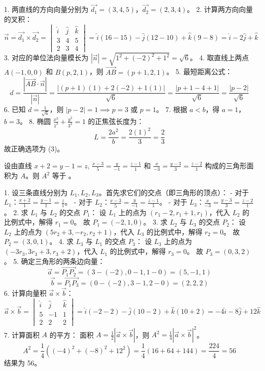 \begin{questions}
\begin{solution}
1. 两直线的方向向量分别为 $\vec{d_1} = (3, 4, 5)$，$\vec{d_2} = (2, 3, 4)$。
2. 计算两方向向量的叉积：
\[
\vec{n} = \vec{d_1} \times \vec{d_2} = \begin{vmatrix} \hat{i} & \hat{j} & \hat{k} \\ 3 & 4 & 5 \\ 2 & 3 & 4 \end{vmatrix} = \hat{i}(16-15) - \hat{j}(12-10) + \hat{k}(9-8) = \hat{i} - 2\hat{j} + \hat{k}
\]
3. 对应的单位法向量模长为 $|\vec{n}| = \sqrt{1^2 + (-2)^2 + 1^2} = \sqrt{6}$。
4. 取直线上两点 $A(-1, 0, 0)$ 和 $B(p, 2, 1)$，则 $\vec{AB} = (p+1, 2, 1)$。
5. 最短距离公式：
\[
d = \frac{|\vec{AB} \cdot \vec{n}|}{|\vec{n}|} = \frac{|(p+1)(1) + 2(-2) + 1(1)|}{\sqrt{6}} = \frac{|p+1-4+1|}{\sqrt{6}} = \frac{|p-2|}{\sqrt{6}}
\]
6. 已知 $d = \frac{1}{\sqrt{6}}$，则 $|p-2| = 1 \implies p = 3$ 或 $p = 1$。
7. 根据 $a < b$，得 $a = 1$，$b = 3$。
8. 椭圆 $\frac{x^2}{1^2} + \frac{y^2}{3^2} = 1$ 的正焦弦长度为：
\[
L = \frac{2a^2}{b} = \frac{2(1)^2}{3} = \frac{2}{3}
\]
故正确选项为 (3)。
\end{solution}

    \question
设由直线 $x + 2 = y - 1 = z$, $\frac{x-3}{5} = \frac{y}{-1} = \frac{z-1}{1}$ 和 $\frac{x}{-3} = \frac{y-3}{3} = \frac{z-2}{1}$ 构成的三角形面积为 $A$。则 $A^2$ 等于 \underline{\quad}。

\begin{solution}
1. 设三条直线分别为 $L_1, L_2, L_3$。首先求它们的交点（即三角形的顶点）：
   - 对于 $L_1$：$\frac{x+2}{1} = \frac{y-1}{1} = \frac{z}{1}$。
   - 对于 $L_2$：$\frac{x-3}{5} = \frac{y}{-1} = \frac{z-1}{1}$。
   - 对于 $L_3$：$\frac{x}{-3} = \frac{y-3}{3} = \frac{z-2}{1}$。
2. 求 $L_1$ 与 $L_2$ 的交点 $P_1$：
   设 $L_1$ 上的点为 $(r_1-2, r_1+1, r_1)$，代入 $L_2$ 的比例式中，解得 $r_1 = 0$。
   故 $P_1 = (-2, 1, 0)$。
3. 求 $L_2$ 与 $L_3$ 的交点 $P_2$：
   设 $L_2$ 上的点为 $(5r_2+3, -r_2, r_2+1)$，代入 $L_3$ 的比例式中，解得 $r_2 = 0$。
   故 $P_2 = (3, 0, 1)$。
4. 求 $L_3$ 与 $L_1$ 的交点 $P_3$：
   设 $L_3$ 上的点为 $(-3r_3, 3r_3+3, r_3+2)$，代入 $L_1$ 的比例式中，解得 $r_3 = 0$。
   故 $P_3 = (0, 3, 2)$。
5. 确定三角形的两条边向量：
\[
\vec{a} = \vec{P_1P_2} = (3 - (-2), 0 - 1, 1 - 0) = (5, -1, 1)
\]
\[
\vec{b} = \vec{P_1P_3} = (0 - (-2), 3 - 1, 2 - 0) = (2, 2, 2)
\]
6. 计算向量积 $\vec{a} \times \vec{b}$：
\[
\vec{a} \times \vec{b} = \begin{vmatrix} \hat{i} & \hat{j} & \hat{k} \\ 5 & -1 & 1 \\ 2 & 2 & 2 \end{vmatrix} = \hat{i}(-2-2) - \hat{j}(10-2) + \hat{k}(10+2) = -4\hat{i} - 8\hat{j} + 12\hat{k}
\]
7. 计算面积 $A$ 的平方：
   面积 $A = \frac{1}{2} |\vec{a} \times \vec{b}|$，则 $A^2 = \frac{1}{4} |\vec{a} \times \vec{b}|^2$。
\[
A^2 = \frac{1}{4} ((-4)^2 + (-8)^2 + 12^2) = \frac{1}{4} (16 + 64 + 144) = \frac{224}{4} = 56
\]
结果为 56。
\end{solution}


\end{questions}
